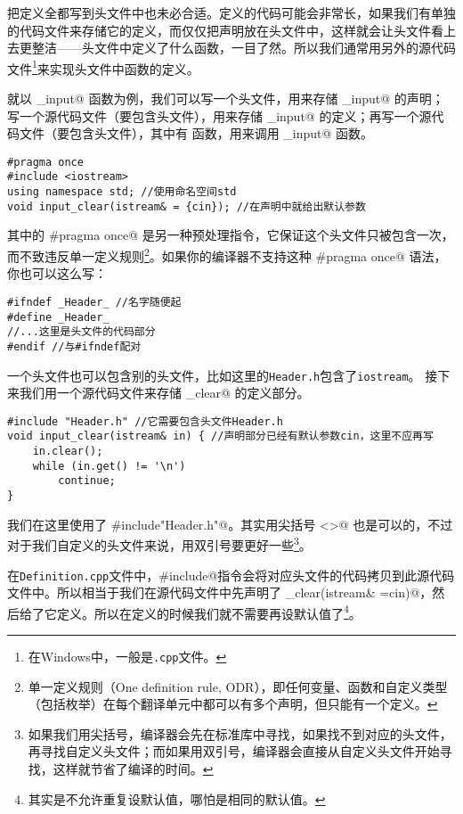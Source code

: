 把定义全都写到头文件中也未必合适。定义的代码可能会非常长，如果我们有单独的代码文件来存储它的定义，而仅仅把声明放在头文件中，这样就会让头文件看上去更整洁——头文件中定义了什么函数，一目了然。所以我们通常用另外的源代码文件\footnote{在Windows中，一般是\texttt{.cpp}文件。}来实现头文件中函数的定义。\par
就以 \lstinline@clear_input@ 函数为例，我们可以写一个头文件，用来存储 \lstinline@clear_input@ 的声明；写一个源代码文件（要包含头文件），用来存储 \lstinline@clear_input@ 的定义；再写一个源代码文件（要包含头文件），其中有 \lstinline@main@ 函数，用来调用 \lstinline@clear_input@ 函数。\par
\begin{lstlisting}[caption=\texttt{Header.h}]
#pragma once
#include <iostream>
using namespace std; //使用命名空间std
void input_clear(istream& = {cin}); //在声明中就给出默认参数
\end{lstlisting}
其中的 \lstinline@#pragma once@ 是另一种预处理指令，它保证这个头文件只被包含一次，而不致违反单一定义规则\footnote{单一定义规则（One definition rule, ODR），即任何变量、函数和自定义类型（包括枚举）在每个翻译单元中都可以有多个声明，但只能有一个定义。}。如果你的编译器不支持这种 \lstinline@#pragma once@ 语法，你也可以这么写：
\begin{lstlisting}
#ifndef _Header_ //名字随便起
#define _Header_ 
//...这里是头文件的代码部分
#endif //与#ifndef配对
\end{lstlisting}\par
一个头文件也可以包含别的头文件，比如这里的\texttt{Header.h}包含了\texttt{iostream}。
接下来我们用一个源代码文件来存储 \lstinline@input_clear@ 的定义部分。
\begin{lstlisting}[caption=\texttt{Definition.cpp}]
#include "Header.h" //它需要包含头文件Header.h
void input_clear(istream& in) { //声明部分已经有默认参数cin，这里不应再写
    in.clear();
    while (in.get() != '\n')
        continue;
}
\end{lstlisting}
我们在这里使用了 \lstinline@#include"Header.h"@。其实用尖括号 \lstinline@<>@ 也是可以的，不过对于我们自定义的头文件来说，用双引号要更好一些\footnote{如果我们用尖括号，编译器会先在标准库中寻找，如果找不到对应的头文件，再寻找自定义头文件；而如果用双引号，编译器会直接从自定义头文件开始寻找，这样就节省了编译的时间。}。\par
在\texttt{Definition.cpp}文件中，\lstinline@#include@指令会将对应头文件的代码拷贝到此源代码文件中。所以相当于我们在源代码文件中先声明了 \lstinline@input_clear(istream& ={cin})@，然后给了它定义。所以在定义的时候我们就不需要再设默认值了\footnote{其实是不允许重复设默认值，哪怕是相同的默认值。}。\par
